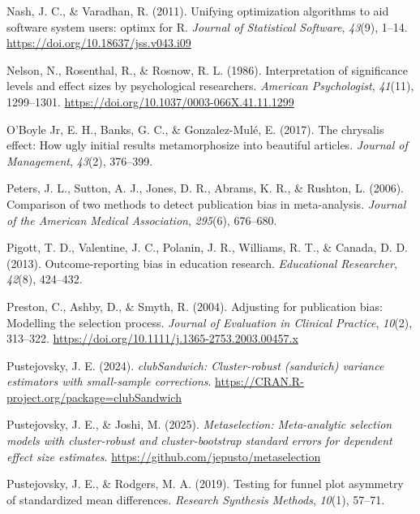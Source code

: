 \documentclass[
  american,
  man, donotrepeattitle,floatsintext]{apa7}
\newlength{\cslhangindent}
\newenvironment{CSLReferences}[2] %
 {\begin{list}{}{%
  \setlength{\itemindent}{0pt}
  \setlength{\leftmargin}{0pt}
  \setlength{\parsep}{0pt}
  \ifodd #1
   \setlength{\leftmargin}{\cslhangindent}
   \setlength{\itemindent}{-1\cslhangindent}
  \fi
  \setlength{\itemsep}{#2\baselineskip}}}
 {\end{list}}
\begin{document}
\begin{CSLReferences}{1}{0}
Nash, J. C., \& Varadhan, R. (2011). Unifying optimization algorithms to aid software system users: {optimx} for {R}. \emph{Journal of Statistical Software}, \emph{43}(9), 1--14. \url{https://doi.org/10.18637/jss.v043.i09}

Nelson, N., Rosenthal, R., \& Rosnow, R. L. (1986). Interpretation of significance levels and effect sizes by psychological researchers. \emph{American Psychologist}, \emph{41}(11), 1299--1301. \url{https://doi.org/10.1037/0003-066X.41.11.1299}

O'Boyle Jr, E. H., Banks, G. C., \& Gonzalez-Mulé, E. (2017). The chrysalis effect: How ugly initial results metamorphosize into beautiful articles. \emph{Journal of Management}, \emph{43}(2), 376--399.

Peters, J. L., Sutton, A. J., Jones, D. R., Abrams, K. R., \& Rushton, L. (2006). Comparison of two methods to detect publication bias in meta-analysis. \emph{Journal of the American Medical Association}, \emph{295}(6), 676--680.

Pigott, T. D., Valentine, J. C., Polanin, J. R., Williams, R. T., \& Canada, D. D. (2013). Outcome-reporting bias in education research. \emph{Educational Researcher}, \emph{42}(8), 424--432.

Preston, C., Ashby, D., \& Smyth, R. (2004). Adjusting for publication bias: Modelling the selection process. \emph{Journal of Evaluation in Clinical Practice}, \emph{10}(2), 313--322. \url{https://doi.org/10.1111/j.1365-2753.2003.00457.x}

Pustejovsky, J. E. (2024). \emph{clubSandwich: Cluster-robust (sandwich) variance estimators with small-sample corrections}. \url{https://CRAN.R-project.org/package=clubSandwich}

Pustejovsky, J. E., \& Joshi, M. (2025). \emph{Metaselection: Meta-analytic selection models with cluster-robust and cluster-bootstrap standard errors for dependent effect size estimates}. \url{https://github.com/jepusto/metaselection}

Pustejovsky, J. E., \& Rodgers, M. A. (2019). Testing for funnel plot asymmetry of standardized mean differences. \emph{Research Synthesis Methods}, \emph{10}(1), 57--71.


\end{CSLReferences}
\end{document}
